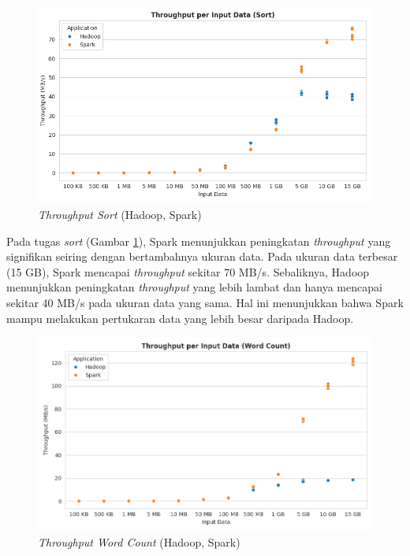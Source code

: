 \begin{figure}[h]
    \centering
    \includegraphics[width=1\textwidth]{figures/ch04/1-throughput-sort.png}
    \caption{\textit{Throughput Sort} (Hadoop, Spark)}
    \label{fig:throughput-sort}
\end{figure}

Pada tugas \textit{sort} (Gambar \ref{fig:throughput-sort}), Spark menunjukkan peningkatan \textit{throughput} yang signifikan seiring dengan bertambahnya ukuran data. Pada ukuran data terbesar (15 GB), Spark mencapai \textit{throughput} sekitar 70 MB/s. Sebaliknya, Hadoop menunjukkan peningkatan \textit{throughput} yang lebih lambat dan hanya mencapai sekitar 40 MB/s pada ukuran data yang sama. Hal ini menunjukkan bahwa Spark mampu melakukan pertukaran data yang lebih besar daripada Hadoop.

\begin{figure}[h]
    \centering
    \includegraphics[width=1\textwidth]{figures/ch04/1-throughput-wordcount.png}
    \caption{\textit{Throughput Word Count} (Hadoop, Spark)}
    \label{fig:throughput-wordcount}
\end{figure}

